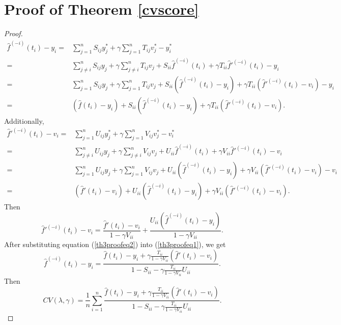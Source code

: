 \section{Proof of Theorem \ref{cvscore}}

\begin{proof}
\begin{equation}\label{th3proofeq1}
\begin{split}
\hat{f}^{(-i)}(t_i)-y_i=& \sum_{j=1}^{n}S_{ij}y_j^*+ \gamma \sum_{j=1}^{n}T_{ij}v_j^*-y_i^*\\
=&\sum_{j\neq i}^{n}S_{ij}y_j+ \gamma \sum_{j\neq i}^{n}T_{ij}v_j+S_{ii}\hat{f}^{(-i)}(t_i)+\gamma T_{ii}\hat{f}'^{(-i)}(t_i)-y_i\\
=&\sum_{j=1}^{n}S_{ij}y_j+ \gamma \sum_{j=1}^{n}T_{ij}v_j+S_{ii}(\hat{f}^{(-i)}(t_i)-y_i)+\gamma T_{ii}(\hat{f}'^{(-i)}(t_i)-v_i)-y_i\\
=&(\hat{f}(t_i)-y_i)+S_{ii}(\hat{f}^{(-i)}(t_i)-y_i)+\gamma T_{ii}(\hat{f}'^{(-i)}(t_i)-v_i).
\end{split}
\end{equation}
Additionally, 
\begin{equation}
\begin{split}
\hat{f}'^{(-i)}(t_i)-v_i=& \sum_{j=1}^{n}U_{ij}y_j^*+ \gamma \sum_{j=1}^{n}V_{ij}v_j^*-v_i^*\\
=&\sum_{j\neq i}^{n}U_{ij}y_j+ \gamma \sum_{j\neq i}^{n}V_{ij}v_j+U_{ii}\hat{f}^{(-i)}(t_i)+\gamma V_{ii}\hat{f}'^{(-i)}(t_i)-v_i\\
=&\sum_{j=1}^{n}U_{ij}y_j+ \gamma \sum_{j=1}^{n}V_{ij}v_j+U_{ii}(\hat{f}^{(-i)}(t_i)-y_i)+\gamma V_{ii}(\hat{f}'^{(-i)}(t_i)-v_i)-v_i\\
=&(\hat{f}'(t_i)-v_i)+U_{ii}(\hat{f}^{(-i)}(t_i)-y_i)+\gamma V_{ii}(\hat{f}'^{(-i)}(t_i)-v_i).
\end{split}
\end{equation}
Then
\begin{equation}\label{th3proofeq2}
\hat{f}'^{(-i)}(t_i)-v_i = \frac{\hat{f}'(t_i)-v_i}{1-\gamma V_{ii}}+ \frac{U_{ii}(\hat{f}^{(-i)}(t_i)-y_i)}{1-\gamma V_{ii}}.
\end{equation}
After substituting equation (\ref{th3proofeq2}) into (\ref{th3proofeq1}), we get
\begin{equation}
\hat{f}^{(-i)}(t_i)-y_i=\frac{\hat{f}(t_i)-y_i+\gamma \frac{T_{ii}}{1-\gamma V_{ii}}(\hat{f}'(t_i)-v_i)}{1-S_{ii}-\gamma\frac{T_{ii}}{1-\gamma V_{ii}}U_{ii}}.
\end{equation}
Then
\begin{equation}
CV(\lambda,\gamma)=\frac{1}{n}\sum_{i=1}^{n}\frac{\hat{f}(t_i)-y_i+\gamma \frac{T_{ii}}{1-\gamma V_{ii}}(\hat{f}'(t_i)-v_i)}{1-S_{ii}-\gamma\frac{T_{ii}}{1-\gamma V_{ii}}U_{ii}}.
\end{equation}
\end{proof}

